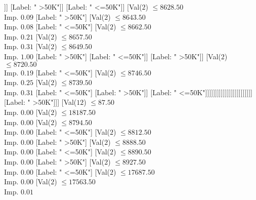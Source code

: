 \documentclass[margin=10pt]{standalone}
\begin{document}
\begin{forest}
																																	[Label: " >50K"]
																																	[Label: " <=50K"]]]
																															[Label: " >50K"]]
																														[Label: " <=50K"]]
																													[Val($2$) $ \leq 8628.50$ \\ Imp. $0.09$
																														[Label: " >50K"]
																														[Val($2$) $ \leq 8643.50$ \\ Imp. $0.08$
																															[Label: " <=50K"]
																															[Val($2$) $ \leq 8662.50$ \\ Imp. $0.21$
																																[Val($2$) $ \leq 8657.50$ \\ Imp. $0.31$
																																	[Val($2$) $ \leq 8649.50$ \\ Imp. $1.00$
																																		[Label: " >50K"]
																																		[Label: " <=50K"]]
																																	[Label: " >50K"]]
																																[Val($2$) $ \leq 8720.50$ \\ Imp. $0.19$
																																	[Label: " <=50K"]
																																	[Val($2$) $ \leq 8746.50$ \\ Imp. $0.25$
																																		[Val($2$) $ \leq 8739.50$ \\ Imp. $0.31$
																																			[Label: " <=50K"]
																																			[Label: " >50K"]]
																																		[Label: " <=50K"]]]]]]]]]]]]]]]]]]]]]]]]
											[Label: " >50K"]]]
									[Val($12$) $ \leq 87.50$ \\ Imp. $0.00$
										[Val($2$) $ \leq 18187.50$ \\ Imp. $0.00$
											[Val($2$) $ \leq 8794.50$ \\ Imp. $0.00$
												[Label: " <=50K"]
												[Val($2$) $ \leq 8812.50$ \\ Imp. $0.00$
													[Label: " >50K"]
													[Val($2$) $ \leq 8888.50$ \\ Imp. $0.00$
														[Label: " <=50K"]
														[Val($2$) $ \leq 8890.50$ \\ Imp. $0.00$
															[Label: " >50K"]
															[Val($2$) $ \leq 8927.50$ \\ Imp. $0.00$
																[Label: " <=50K"]
																[Val($2$) $ \leq 17687.50$ \\ Imp. $0.00$
																	[Val($2$) $ \leq 17563.50$ \\ Imp. $0.01$

\end{forest}
\end{document}
